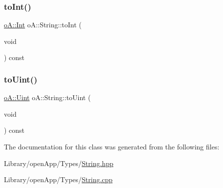\subsubsection{\texorpdfstring{to\+Int()}{toInt()}}
{\footnotesize\ttfamily \mbox{\hyperlink{namespaceo_a_aa575525a7b0116822c73d43fa671a58c}{o\+A\+::\+Int}} o\+A\+::\+String\+::to\+Int (\begin{DoxyParamCaption}\item[{void}]{ }\end{DoxyParamCaption}) const}

\mbox{\label{classo_a_1_1_string_a959f6a81bf2fa3e6fa001642608e2af2}} 
\subsubsection{\texorpdfstring{to\+Uint()}{toUint()}}
{\footnotesize\ttfamily \mbox{\hyperlink{namespaceo_a_abe1d8250226c5cf34f84d7b75fc7922e}{o\+A\+::\+Uint}} o\+A\+::\+String\+::to\+Uint (\begin{DoxyParamCaption}\item[{void}]{ }\end{DoxyParamCaption}) const}



The documentation for this class was generated from the following files\+:\begin{DoxyCompactItemize}
\item 
Library/open\+App/\+Types/\mbox{\hyperlink{_string_8hpp}{String.\+hpp}}\item 
Library/open\+App/\+Types/\mbox{\hyperlink{_string_8cpp}{String.\+cpp}}\end{DoxyCompactItemize}
